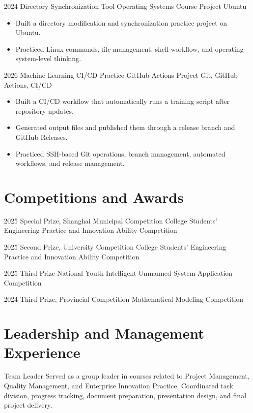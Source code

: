 \documentclass[10pt,a4paper,sans]{moderncv}
\begin{document}
\cventry
{2024}
{Directory Synchronization Tool}
{Operating Systems Course Project}
{Ubuntu}
{}
{
\begin{itemize}
    \item Built a directory modification and synchronization practice project on Ubuntu.
    \item Practiced Linux commands, file management, shell workflow, and operating-system-level thinking.
\end{itemize}
}

\cventry
{2026}
{Machine Learning CI/CD Practice}
{GitHub Actions Project}
{Git, GitHub Actions, CI/CD}
{}
{
\begin{itemize}
    \item Built a CI/CD workflow that automatically runs a training script after repository updates.
    \item Generated output files and published them through a release branch and GitHub Releases.
    \item Practiced SSH-based Git operations, branch management, automated workflows, and release management.
\end{itemize}
}

\section{Competitions and Awards}

\cventry
{2025}
{Special Prize, Shanghai Municipal Competition}
{College Students' Engineering Practice and Innovation Ability Competition}
{}
{}
{}

\cventry
{2025}
{Second Prize, University Competition}
{College Students' Engineering Practice and Innovation Ability Competition}
{}
{}
{}

\cventry
{2025}
{Third Prize}
{National Youth Intelligent Unmanned System Application Competition}
{}
{}
{}

\cventry
{2024}
{Third Prize, Provincial Competition}
{Mathematical Modeling Competition}
{}
{}
{}

\section{Leadership and Management Experience}

\cvitem
{Team Leader}
{Served as a group leader in courses related to Project Management, Quality Management, and Enterprise Innovation Practice. Coordinated task division, progress tracking, document preparation, presentation design, and final project delivery.}
\end{document}

